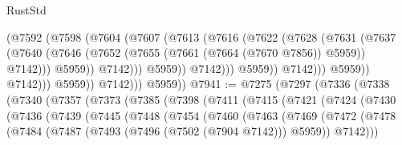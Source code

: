 \begin{lexlean}{RustStd}
\begin{coremodule}
                                      (@7592
                                        (@7598
                                          (@7604
                                            (@7607
                                              (@7613
                                                (@7616
                                                  (@7622
                                                    (@7628
                                                      (@7631
                                                        (@7637
                                                          (@7640
                                                            (@7646
                                                              (@7652
                                                                (@7655
                                                                  (@7661
                                                                    (@7664 (@7670 @7856))
                                                                    @5959))
                                                                @7142)))
                                                          @5959))
                                                      @7142)))
                                                @5959))
                                            @7142)))
                                      @5959))
                                  @7142)))
                            @5959))
                        @7142)))
                  @5959))
              @7142)))
        @5959))
@7941 := @7275
    (@7297
      (@7336
        (@7338
          (@7340
            (@7357
              (@7373
                (@7385
                  (@7398
                    (@7411
                      (@7415
                        (@7421
                          (@7424
                            (@7430
                              (@7436
                                (@7439
                                  (@7445
                                    (@7448
                                      (@7454
                                        (@7460
                                          (@7463
                                            (@7469
                                              (@7472
                                                (@7478
                                                  (@7484
                                                    (@7487
                                                      (@7493 (@7496 (@7502 (@7904 @7142))) @5959))
                                                    @7142)))

\end{coremodule}
\end{lexlean}
